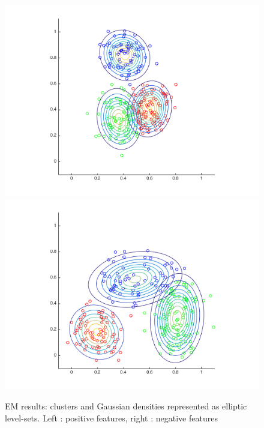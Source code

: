 \documentclass[a4paper, 12pt]{article}
\begin{document}
\begin{figure}[H]
	\centering
	\noindent\includegraphics[scale=0.4]{em_pos.png}
	\noindent\includegraphics[scale=0.4]{em_neg.png}
	\caption{EM results: clusters and Gaussian densities represented as elliptic level-sets. Left : positive features, right : negative features}
\end{figure}
\end{document}

